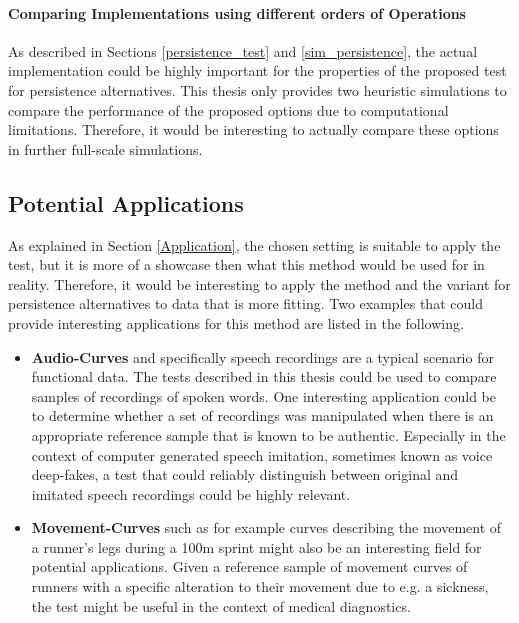 \documentclass[12pt, a4paper]{article}
\theoremstyle{MAstyle} \newtheorem{assumption}{Assumption}[section]
\theoremstyle{MAstyle} \newtheorem{definition}{Definition}[section]
\theoremstyle{MAstyle} \newtheorem{theorem}{Theorem}[section]
\begin{document}
			\paragraph{Comparing Implementations using different orders of Operations\\}
			As described in Sections \ref{persistence_test} and \ref{sim_persistence}, the actual implementation could be highly important for the properties of the proposed test for persistence alternatives. This thesis only provides two heuristic simulations to compare the performance of the proposed options due to computational limitations. Therefore, it would be interesting to actually compare these options in further full-scale simulations.
		
		\subsection{Potential Applications}\label{pot_appl}
			As explained in Section \ref{Application}, the chosen setting is suitable to apply the test, but it is more of a showcase then what this method would be used for in reality. Therefore, it would be interesting to apply the method and the variant for persistence alternatives to data that is more fitting. Two examples that could provide interesting applications for this method are listed in the following.
			\begin{itemize}
				\item \textbf{Audio-Curves} and specifically speech recordings are a typical scenario for functional data. The tests described in this thesis could be used to compare samples of recordings of spoken words. One interesting application could be to determine whether a set of recordings was manipulated when there is an appropriate reference sample that is known to be authentic. Especially in the context of computer generated speech imitation, sometimes known as voice deep-fakes, a test that could reliably distinguish between original and imitated speech recordings could be highly relevant.
				\item \textbf{Movement-Curves} such as for example curves describing the movement of a runner's legs during a 100m sprint might also be an interesting field for potential applications. Given a reference sample of movement curves of runners with a specific alteration to their movement due to e.g. a sickness, the test might be useful in the context of medical diagnostics.
			\end{itemize}
		
\end{document}
